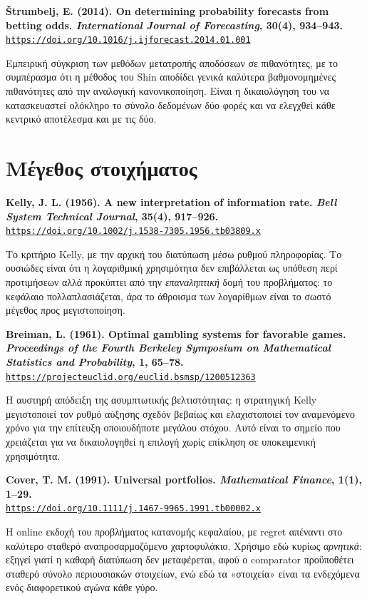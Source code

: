 \documentclass[11pt,a4paper]{article}
\newcommand{\src}[3]{%
  \par\medskip\noindent\textbf{#2}\\
  \href{#3}{\texttt{\small #3}}\par\smallskip}
\begin{document}
\src{strumbelj2014}{Štrumbelj, E. (2014). On determining probability forecasts from betting
odds. \emph{International Journal of Forecasting}, 30(4), 934--943.}
{https://doi.org/10.1016/j.ijforecast.2014.01.001}
Εμπειρική σύγκριση των μεθόδων μετατροπής αποδόσεων σε πιθανότητες, με το συμπέρασμα ότι η
μέθοδος του Shin αποδίδει γενικά καλύτερα βαθμονομημένες πιθανότητες από την αναλογική
κανονικοποίηση. Είναι η δικαιολόγηση του να κατασκευαστεί ολόκληρο το σύνολο δεδομένων δύο
φορές και να ελεγχθεί κάθε κεντρικό αποτέλεσμα και με τις δύο.

\section{Μέγεθος στοιχήματος}

\src{kelly1956}{Kelly, J. L. (1956). A new interpretation of information rate. \emph{Bell
System Technical Journal}, 35(4), 917--926.}
{https://doi.org/10.1002/j.1538-7305.1956.tb03809.x}
Το κριτήριο Kelly, με την αρχική του διατύπωση μέσω ρυθμού πληροφορίας. Το ουσιώδες είναι ότι
η λογαριθμική χρησιμότητα δεν επιβάλλεται ως υπόθεση περί προτιμήσεων αλλά προκύπτει από την
\emph{επαναληπτική} δομή του προβλήματος: το κεφάλαιο πολλαπλασιάζεται, άρα το άθροισμα των
λογαρίθμων είναι το σωστό μέγεθος προς μεγιστοποίηση.

\src{breiman1961}{Breiman, L. (1961). Optimal gambling systems for favorable games.
\emph{Proceedings of the Fourth Berkeley Symposium on Mathematical Statistics and
Probability}, 1, 65--78.}
{https://projecteuclid.org/euclid.bsmsp/1200512363}
Η αυστηρή απόδειξη της ασυμπτωτικής βελτιστότητας: η στρατηγική Kelly μεγιστοποιεί τον ρυθμό
αύξησης σχεδόν βεβαίως και ελαχιστοποιεί τον αναμενόμενο χρόνο για την επίτευξη οποιουδήποτε
μεγάλου στόχου. Αυτό είναι το σημείο που χρειάζεται για να δικαιολογηθεί η επιλογή χωρίς
επίκληση σε υποκειμενική χρησιμότητα.

\src{cover1991}{Cover, T. M. (1991). Universal portfolios. \emph{Mathematical Finance}, 1(1),
1--29.}
{https://doi.org/10.1111/j.1467-9965.1991.tb00002.x}
Η online εκδοχή του προβλήματος κατανομής κεφαλαίου, με regret απέναντι στο καλύτερο σταθερό
αναπροσαρμοζόμενο χαρτοφυλάκιο. Χρήσιμο εδώ κυρίως \emph{αρνητικά}: εξηγεί γιατί η καθαρή
διατύπωση δεν μεταφέρεται, αφού ο comparator προϋποθέτει σταθερό σύνολο περιουσιακών
στοιχείων, ενώ εδώ τα «στοιχεία» είναι τα ενδεχόμενα ενός διαφορετικού αγώνα κάθε γύρο.
\end{document}
